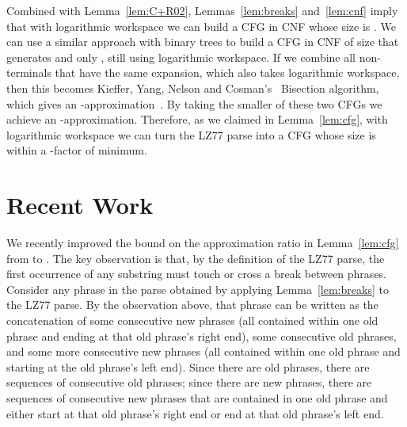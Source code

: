 \documentclass[runningheads]{llncs}
\begin{document}
Combined with Lemma~\ref{lem:C+R02}, Lemmas~\ref{lem:breaks} and~\ref{lem:cnf} imply that with logarithmic workspace we can build a CFG in CNF whose size is .  We can use a similar approach with binary trees to build a CFG in CNF of size  that generates  and only , still using logarithmic workspace.  If we combine all non-terminals that have the same expansion, which also takes logarithmic workspace, then this becomes Kieffer, Yang, Nelson and Cosman's~\cite{KYNC00} {\sc Bisection} algorithm, which gives an -approximation~\cite{CLLP+05}.  By taking the smaller of these two CFGs we achieve an -approximation.  Therefore, as we claimed in Lemma~\ref{lem:cfg}, with logarithmic workspace we can turn the LZ77 parse into a CFG whose size is within a -factor of minimum.

\section{Recent Work} \label{sec:recent}

We recently improved the bound on the approximation ratio in Lemma~\ref{lem:cfg} from  to .  The key observation is that, by the definition of the LZ77 parse, the first occurrence of any substring must touch or cross a break between phrases.  Consider any phrase in the parse obtained by applying Lemma~\ref{lem:breaks} to the LZ77 parse.  By the observation above, that phrase can be written as the concatenation of some consecutive new phrases (all contained within one old phrase and ending at that old phrase's right end), some consecutive old phrases, and some more consecutive new phrases (all contained within one old phrase and starting at the old phrase's left end).  Since there are  old phrases, there are  sequences of consecutive old phrases; since there are  new phrases, there are  sequences of consecutive new phrases that are contained in one old phrase and either start at that old phrase's right end or end at that old phrase's left end.
\end{document}
